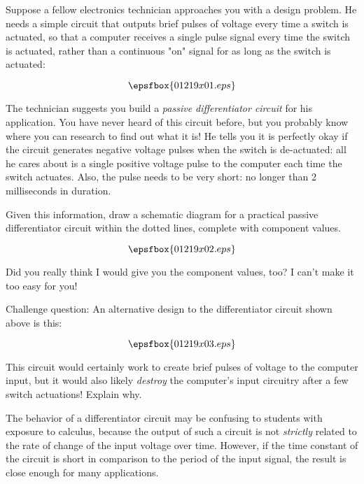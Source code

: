 

Suppose a fellow electronics technician approaches you with a design problem.  He needs a simple circuit that outputs brief pulses of voltage every time a switch is actuated, so that a computer receives a single pulse signal every time the switch is actuated, rather than a continuous "on" signal for as long as the switch is actuated:

$$\epsfbox{01219x01.eps}$$

The technician suggests you build a {\it passive differentiator circuit} for his application.  You have never heard of this circuit before, but you probably know where you can research to find out what it is!  He tells you it is perfectly okay if the circuit generates negative voltage pulses when the switch is de-actuated: all he cares about is a single positive voltage pulse to the computer each time the switch actuates.  Also, the pulse needs to be very short: no longer than 2 milliseconds in duration.

Given this information, draw a schematic diagram for a practical passive differentiator circuit within the dotted lines, complete with component values.







$$\epsfbox{01219x02.eps}$$

Did you really think I would give you the component values, too?  I can't make it too easy for you!

\vskip 10pt

Challenge question: An alternative design to the differentiator circuit shown above is this:

$$\epsfbox{01219x03.eps}$$

This circuit would certainly work to create brief pulses of voltage to the computer input, but it would also likely {\it destroy} the computer's input circuitry after a few switch actuations!  Explain why.







The behavior of a differentiator circuit may be confusing to students with exposure to calculus, because the output of such a circuit is not {\it strictly} related to the rate of change of the input voltage over time.  However, if the time constant of the circuit is short in comparison to the period of the input signal, the result is close enough for many applications.




